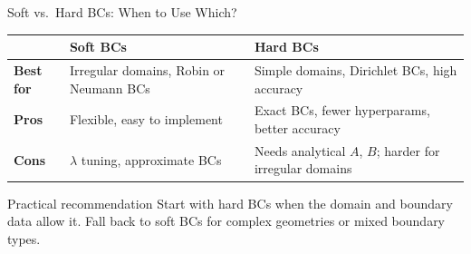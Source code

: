 \documentclass[aspectratio=169,11pt]{beamer}
\newcommand{\emphc}[1]{\textcolor{harvardcrimson}{#1}}
\begin{document}
\begin{frame}{Soft vs.\ Hard BCs: When to Use Which?}
\begin{center}
{\small
\begin{tabular}{p{2.2cm}>{\raggedright\arraybackslash}p{4.5cm}>{\raggedright\arraybackslash}p{4.5cm}}
\toprule
& \textbf{Soft BCs} & \textbf{Hard BCs} \\
\midrule
\textbf{Best for} & Irregular domains, Robin or Neumann BCs & Simple domains, Dirichlet BCs, high accuracy \\
\midrule
\textbf{Pros} & Flexible, easy to implement & Exact BCs, fewer hyperparams, better accuracy \\
\midrule
\textbf{Cons} & $\lambda$ tuning, approximate BCs & Needs analytical $A$, $B$; harder for irregular domains \\
\bottomrule
\end{tabular}
}
\end{center}

\vspace{0.3em}
\begin{block}{Practical recommendation}
Start with \emphc{hard BCs} when the domain and boundary data allow it.
Fall back to \emphc{soft BCs} for complex geometries or mixed boundary types.
\end{block}
\end{frame}


\end{document}

